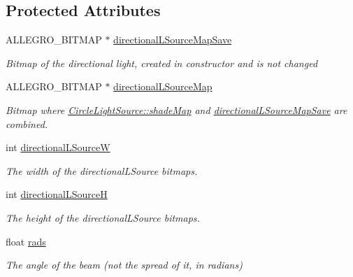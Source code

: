 \subsection*{Protected Attributes}
\begin{DoxyCompactItemize}
\item 
A\+L\+L\+E\+G\+R\+O\+\_\+\+B\+I\+T\+M\+AP $\ast$ \hyperlink{classlighting_1_1DirectionalLightSource_a021658da101e47c909858b2c17d387ff}{directional\+L\+Source\+Map\+Save}
\begin{DoxyCompactList}\small\item\em Bitmap of the directional light, created in constructor and is not changed \end{DoxyCompactList}\item 
A\+L\+L\+E\+G\+R\+O\+\_\+\+B\+I\+T\+M\+AP $\ast$ \hyperlink{classlighting_1_1DirectionalLightSource_afc3f2e73813a6d9c035aa0d58ad5d37c}{directional\+L\+Source\+Map}
\begin{DoxyCompactList}\small\item\em Bitmap where \hyperlink{classlighting_1_1CircleLightSource_a382414c9318853e93c85bc64bcd19f4e}{Circle\+Light\+Source\+::shade\+Map} and \hyperlink{classlighting_1_1DirectionalLightSource_a021658da101e47c909858b2c17d387ff}{directional\+L\+Source\+Map\+Save} are combined. \end{DoxyCompactList}\item 
int \hyperlink{classlighting_1_1DirectionalLightSource_af4372a31b5f7938c18723f53265922e7}{directional\+L\+SourceW}
\begin{DoxyCompactList}\small\item\em The width of the directional\+L\+Source bitmaps. \end{DoxyCompactList}\item 
int \hyperlink{classlighting_1_1DirectionalLightSource_a6587335669534fd8f4727c73dbd49c28}{directional\+L\+SourceH}
\begin{DoxyCompactList}\small\item\em The height of the directional\+L\+Source bitmaps. \end{DoxyCompactList}\item 
float \hyperlink{classlighting_1_1DirectionalLightSource_af31141ab246928972aa52224e17ae46c}{rads}
\begin{DoxyCompactList}\small\item\em The angle of the beam (not the spread of it, in radians) \end{DoxyCompactList}\end{DoxyCompactItemize}
